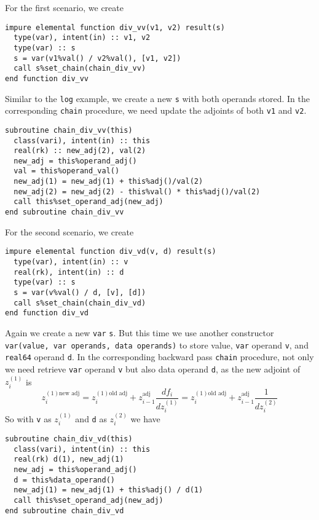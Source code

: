 \documentclass[12pt, reqno, oneside]{amsbook}
\numberwithin{equation}{chapter}
\begin{document}
For the first scenario, we create
\begin{verbatim}
impure elemental function div_vv(v1, v2) result(s)
  type(var), intent(in) :: v1, v2
  type(var) :: s
  s = var(v1%val() / v2%val(), [v1, v2])
  call s%set_chain(chain_div_vv)
end function div_vv
\end{verbatim}
Similar to the \texttt{log} example, we create a new \texttt{s} with both operands
stored. In the corresponding \texttt{chain} procedure, we need update
the adjoints of both \texttt{v1} and \texttt{v2}.
\begin{verbatim}
subroutine chain_div_vv(this)
  class(vari), intent(in) :: this
  real(rk) :: new_adj(2), val(2)
  new_adj = this%operand_adj()
  val = this%operand_val()
  new_adj(1) = new_adj(1) + this%adj()/val(2)
  new_adj(2) = new_adj(2) - this%val() * this%adj()/val(2)
  call this%set_operand_adj(new_adj)
end subroutine chain_div_vv
\end{verbatim}

For the second scenario, we create
\begin{verbatim}
impure elemental function div_vd(v, d) result(s)
  type(var), intent(in) :: v
  real(rk), intent(in) :: d
  type(var) :: s
  s = var(v%val() / d, [v], [d])
  call s%set_chain(chain_div_vd)
end function div_vd
\end{verbatim}
Again we create a new \texttt{var} \texttt{s}. But this time
we use another constructor \texttt{var(value, var operands, data
operands)} to store value, \texttt{var} operand \texttt{v}, and \texttt{real64}
operand \texttt{d}. In the corresponding backward pass \texttt{chain} procedure, not
      only we need retrieve \texttt{var} operand \texttt{v} but also data operand
      \texttt{d}, as the new adjoint of \(z_i^{(1)}\) is
\begin{equation*}
z_i^{(1)\text{new adj}} = z_i^{(1)\text{old adj}} + z_{i-1}^{\text{adj}}\frac{df_i}{dz_i^{(1)}}
= z_i^{(1)\text{old adj}} + z_{i-1}^{\text{adj}}\frac{1}{dz_i^{(2)}}
\end{equation*}      
So with \texttt{v} as \(z_i^{(1)}\) and \texttt{d} as \(z_i^{(2)}\) we have
\begin{verbatim}
subroutine chain_div_vd(this)
  class(vari), intent(in) :: this
  real(rk) d(1), new_adj(1)
  new_adj = this%operand_adj()
  d = this%data_operand()
  new_adj(1) = new_adj(1) + this%adj() / d(1)
  call this%set_operand_adj(new_adj)
end subroutine chain_div_vd
\end{verbatim}
\end{document}

